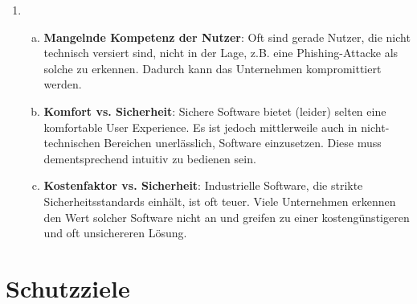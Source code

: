 \documentclass[a4paper,11pt]{scrartcl}
\begin{document}
\begin{enumerate}[1.]
    \item
        \begin{enumerate}[(a)]
            \item \textbf{Mangelnde Kompetenz der Nutzer}:
                  Oft sind gerade Nutzer, die nicht technisch versiert sind,
                  nicht in der Lage, z.B. eine Phishing-Attacke als solche zu
                  erkennen. Dadurch kann das Unternehmen kompromittiert werden.
            \item \textbf{Komfort vs. Sicherheit}:
                  Sichere Software bietet (leider) selten eine komfortable
                  User Experience. Es ist jedoch mittlerweile auch in nicht-technischen
                  Bereichen unerlässlich, Software einzusetzen. Diese muss
                  dementsprechend intuitiv zu bedienen sein.
            \item \textbf{Kostenfaktor vs. Sicherheit}:
                  Industrielle Software, die strikte Sicherheitsstandards
                  einhält, ist oft teuer. Viele Unternehmen erkennen den Wert
                  solcher Software nicht an und greifen zu einer
                  kostengünstigeren und oft unsichereren Lösung.
        \end{enumerate}
\end{enumerate}

\section{Schutzziele}
\end{document}
